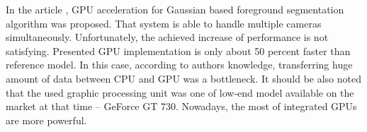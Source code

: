 \documentclass[b5paper,10pt,twoside]{article}
\begin{document}
{%
%



In the article \cite{Boghdady_2015}, GPU acceleration for Gaussian based foreground segmentation algorithm was proposed. That system is able to handle multiple cameras simultaneously. Unfortunately, the achieved increase of performance is not satisfying. Presented GPU implementation is only about 50 percent faster than reference model. In this case, according to authors knowledge, transferring huge amount of data between CPU and GPU was a bottleneck. It should be also noted that the used graphic processing unit was one of low-end model available on the market at that time -- GeForce GT 730. Nowadays, the most of integrated GPUs are more powerful.  



}
\end{document}

